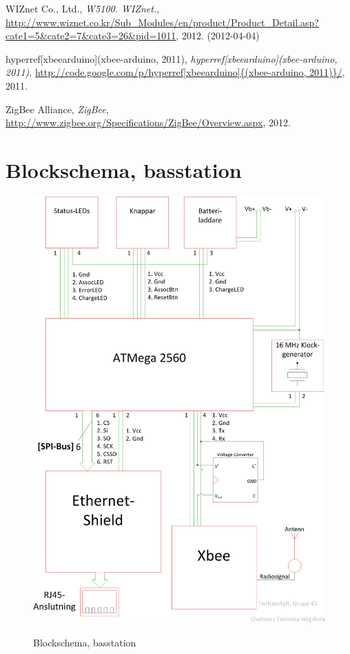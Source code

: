 \documentclass[a4paper,11pt]{article}
\begin{document}
\begin{thebibliography}{9}
\label{wiznet}
    WIZnet Co., Ltd.,
    \emph{W5100.  WIZnet.},
    \url{http://www.wiznet.co.kr/Sub_Modules/en/product/Product_Detail.asp?cate1=5&cate2=7&cate3=26&pid=1011},
    2012. (2012-04-04)

\label{xbeearduino}
hyperref[xbeearduino]{(xbee-arduino, 2011)},
\emph{hyperref[xbeearduino]{(xbee-arduino, 2011)}},
\url{http://code.google.com/p/hyperref[xbeearduino]{(xbee-arduino, 2011)}/},
2011.

\label{zigbee}
    ZigBee Alliance,
    \emph{ZigBee},
    \url{http://www.zigbee.org/Specifications/ZigBee/Overview.aspx},
    2012.

\end{thebibliography}

\appendix
\renewcommand{\appendixpagename}{Appendix}
\appendixpage
\renewcommand{\appendixtocname}{Appendix}

\addappheadtotoc

\section{Blockschema, basstation}

\begin{figure}[H]
\includegraphics[scale=0.6, angle=0]{block_bas.png}
\label{fig:block_bas}
\caption{Blockschema, basstation}
\end{figure}
\pagebreak
\end{document}

